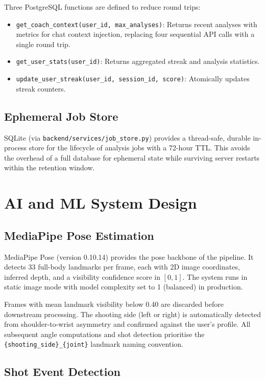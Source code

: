 Three PostgreSQL functions are defined to reduce round trips:

\begin{itemize}
  \item \lstinline|get_coach_context(user_id, max_analyses)|: Returns recent analyses with metrics for chat context injection, replacing four sequential API calls with a single round trip.
  \item \lstinline|get_user_stats(user_id)|: Returns aggregated streak and analysis statistics.
  \item \lstinline|update_user_streak(user_id, session_id, score)|: Atomically updates streak counters.
\end{itemize}

\subsection{Ephemeral Job Store}

SQLite (via \lstinline|backend/services/job_store.py|) provides a thread-safe, durable in-process store for the lifecycle of analysis jobs with a 72-hour TTL. This avoids the overhead of a full database for ephemeral state while surviving server restarts within the retention window.

\section{AI and ML System Design}
\label{sec:ai_design}

\subsection{MediaPipe Pose Estimation}

MediaPipe Pose (version 0.10.14) provides the pose backbone of the pipeline. It detects 33 full-body landmarks per frame, each with 2D image coordinates, inferred depth, and a visibility confidence score in $[0, 1]$. The system runs in static image mode with model complexity set to 1 (balanced) in production.

Frames with mean landmark visibility below 0.40 are discarded before downstream processing. The shooting side (left or right) is automatically detected from shoulder-to-wrist asymmetry and confirmed against the user's profile. All subsequent angle computations and shot detection prioritise the \lstinline|{shooting_side}_{joint}| landmark naming convention.

\subsection{Shot Event Detection}

